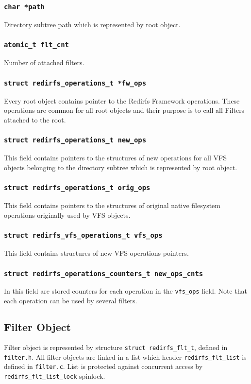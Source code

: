 \subsubsection{\texttt{char *path}}
Directory subtree path which is represented by root object.

\subsubsection{\texttt{atomic\_t flt\_cnt}}
Number of attached filters.

\subsubsection{\texttt{struct redirfs\_operations\_t *fw\_ops}}
Every root object contains pointer to the Redirfs Framework operations. These
operations are common for all root objects and their purpose is to call all Filters
attached to the root.

\subsubsection{\texttt{struct redirfs\_operations\_t new\_ops}}
This field contains pointers to the structures of new operations for all VFS objects
belonging to the directory subtree which is represented by root object.

\subsubsection{\texttt{struct redirfs\_operations\_t orig\_ops}}
This field contains pointers to the structures of original native filesystem
operations originally used by VFS objects. 

\subsubsection{\texttt{struct redirfs\_vfs\_operations\_t vfs\_ops}}
This field contains structures of new VFS operations pointers.

\subsubsection{\texttt{struct redirfs\_operations\_counters\_t new\_ops\_cnts}}
In this field are stored counters for each operation in the \texttt{vfs\_ops} field.
Note that each operation can be used by several filters.

\subsection{Filter Object}
Filter object is represented by structure \texttt{struct redirfs\_flt\_t}, defined in
\texttt{filter.h}. All filter objects are linked in a list which header
\texttt{redirfs\_flt\_list} is defined in \texttt{filter.c}. List is protected against
concurrent access by \texttt{redirfs\_flt\_list\_lock} spinlock.

